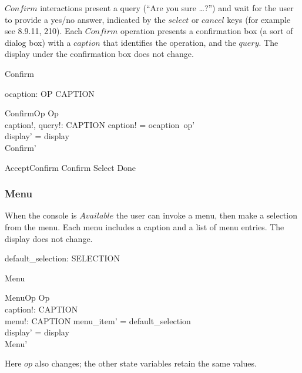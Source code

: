 \documentclass{article}
\begin{document}
$Confirm$ interactions present a query (``Are you sure \dots ?'')  and
wait for the user to provide a yes/no answer, indicated by the
$select$ or $cancel$ keys (for example see 8.9.11, 210).  Each
$Confirm$ operation presents a confirmation box (a sort of dialog box)
with a $caption$ that identifies the operation, and the $query$.  The
display under the confirmation box does not change.
	
\begin{zed}
	Confirm 
\end{zed}

\begin{axdef} 
	ocaption: OP \fun CAPTION \\
\end{axdef}

\begin{schema}{ConfirmOp}
	Op \\
	caption!, query!: CAPTION
\where	
	caption! = ocaption~op' \\
	display' = display \\
	Confirm' \\
\end{schema}
	
\begin{zed}
	AcceptConfirm  Confirm \land Select \land Done
\end{zed}

\subsubsection{Menu}

When the console is $Available$ the user can invoke a menu, then make
a selection from the menu.  Each menu includes a caption and a list of
menu entries. The display does not change.

\begin{axdef}
	default\_selection: SELECTION
\end{axdef}

\begin{zed}Menu  \end{zed}

\begin{schema}{MenuOp}
	Op \\
	caption!: CAPTION \\
	menu!: \iseq CAPTION
\where
	menu\_item' = default\_selection \\
	display' = display \\
	Menu'
\end{schema}
Here $op$ also changes; the other state variables retain the same
values.  
\end{document}
